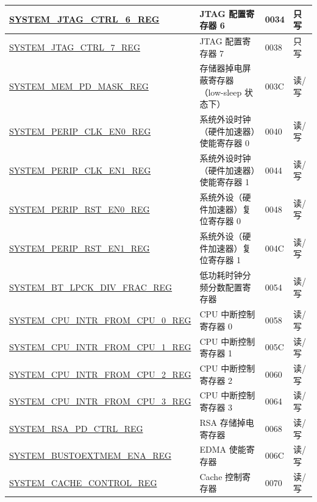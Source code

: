 \begin{longtable}{ | p{7cm} | p{7cm} | p{1.3cm} | p{1cm} | }
\hyperref[regdesc:SYSTEMJTAGCTRL6REG]{SYSTEM\_JTAG\_CTRL\_6\_REG} & JTAG 配置寄存器 6 & \hexprefix{}0034 & 只写 \\ \hline
\hyperref[regdesc:SYSTEMJTAGCTRL7REG]{SYSTEM\_JTAG\_CTRL\_7\_REG} & JTAG 配置寄存器 7 & \hexprefix{}0038 & 只写 \\ \hline
\hyperref[regdesc:SYSTEMMEMPDMASKREG]{SYSTEM\_MEM\_PD\_MASK\_REG} & 存储器掉电屏蔽寄存器（low-sleep 状态下） & \hexprefix{}003C & 读/写 \\ \hline
\hyperref[regdesc:SYSTEMPERIPCLKEN0REG]{SYSTEM\_PERIP\_CLK\_EN0\_REG} & 系统外设时钟（硬件加速器）使能寄存器 0 & \hexprefix{}0040 & 读/写 \\ \hline
\hyperref[regdesc:SYSTEMPERIPCLKEN1REG]{SYSTEM\_PERIP\_CLK\_EN1\_REG} & 系统外设时钟（硬件加速器）使能寄存器 1 & \hexprefix{}0044 & 读/写 \\ \hline
\hyperref[regdesc:SYSTEMPERIPRSTEN0REG]{SYSTEM\_PERIP\_RST\_EN0\_REG} & 系统外设（硬件加速器）复位寄存器 0 & \hexprefix{}0048 & 读/写 \\ \hline
\hyperref[regdesc:SYSTEMPERIPRSTEN1REG]{SYSTEM\_PERIP\_RST\_EN1\_REG} & 系统外设（硬件加速器）复位寄存器 1 & \hexprefix{}004C & 读/写 \\ \hline
\hyperref[regdesc:SYSTEMBTLPCKDIVFRACREG]{SYSTEM\_BT\_LPCK\_DIV\_FRAC\_REG} & 低功耗时钟分频分数配置寄存器 & \hexprefix{}0054 & 读/写 \\ \hline
\hyperref[regdesc:SYSTEMCPUINTRFROMCPU0REG]{SYSTEM\_CPU\_INTR\_FROM\_CPU\_0\_REG} & CPU 中断控制寄存器 0 & \hexprefix{}0058 & 读/写 \\ \hline
\hyperref[regdesc:SYSTEMCPUINTRFROMCPU1REG]{SYSTEM\_CPU\_INTR\_FROM\_CPU\_1\_REG} & CPU 中断控制寄存器 1 & \hexprefix{}005C & 读/写 \\ \hline
\hyperref[regdesc:SYSTEMCPUINTRFROMCPU2REG]{SYSTEM\_CPU\_INTR\_FROM\_CPU\_2\_REG} & CPU 中断控制寄存器 2 & \hexprefix{}0060 & 读/写 \\ \hline
\hyperref[regdesc:SYSTEMCPUINTRFROMCPU3REG]{SYSTEM\_CPU\_INTR\_FROM\_CPU\_3\_REG} & CPU 中断控制寄存器 3 & \hexprefix{}0064 & 读/写 \\ \hline
\hyperref[regdesc:SYSTEMRSAPDCTRLREG]{SYSTEM\_RSA\_PD\_CTRL\_REG} & RSA 存储掉电寄存器 & \hexprefix{}0068 & 读/写 \\ \hline
\hyperref[regdesc:SYSTEMBUSTOEXTMEMENAREG]{SYSTEM\_BUSTOEXTMEM\_ENA\_REG} & EDMA 使能寄存器 & \hexprefix{}006C & 读/写 \\ \hline
\hyperref[regdesc:SYSTEMCACHECONTROLREG]{SYSTEM\_CACHE\_CONTROL\_REG} & Cache 控制寄存器 & \hexprefix{}0070 & 读/写 \\ \hline

\end{longtable}
